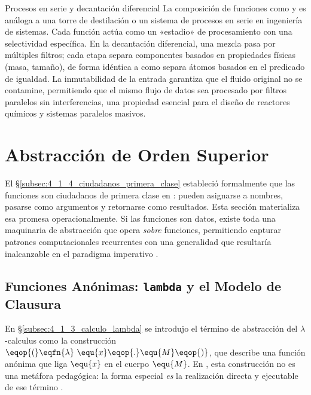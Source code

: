 \begin{fisicaconexion}{Procesos en serie y decantación diferencial}
La composición de funciones como  y  es análoga a una torre de destilación o un sistema de procesos en serie en ingeniería de sistemas. Cada función actúa como un «estadio» de procesamiento con una selectividad específica. En la decantación diferencial, una mezcla pasa por múltiples filtros; cada etapa separa componentes basados en propiedades físicas (masa, tamaño), de forma idéntica a como  separa átomos basados en el predicado de igualdad. La inmutabilidad de la entrada garantiza que el fluido original no se contamine, permitiendo que el mismo flujo de datos sea procesado por filtros paralelos sin interferencias, una propiedad esencial para el diseño de reactores químicos y sistemas paralelos masivos.
\end{fisicaconexion}



\section{Abstracción de Orden Superior}
\label{sec:4_4_orden_superior}

El §\ref{subsec:4_1_4_ciudadanos_primera_clase} estableció formalmente que las funciones son ciudadanos de primera clase en : pueden asignarse a nombres, pasarse como argumentos y retornarse como resultados. Esta sección materializa esa promesa operacionalmente. Si las funciones son datos, existe toda una maquinaria de abstracción que opera \textit{sobre} funciones, permitiendo capturar patrones computacionales recurrentes con una generalidad que resultaría inalcanzable en el paradigma imperativo \cite{SICP, HtDP}.

\subsection{Funciones Anónimas: \texttt{lambda} y el Modelo de Clausura}
\label{subsec:4_4_1_lambda}

En §\ref{subsec:4_1_3_calculo_lambda} se introdujo el término de abstracción del $\lambda$-calculus como la construcción $\eqop{(}\eqfn{\lambda}\ \equ{x} \eqop{.} \equ{M}\eqop{)}$, que describe una función anónima que liga $\equ{x}$ en el cuerpo $\equ{M}$. En , esta construcción no es una metáfora pedagógica: la forma especial  \textit{es} la realización directa y ejecutable de ese término \cite{SICP, PFPL}.

